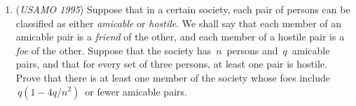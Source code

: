 \begin{enumerate}
(ii) there is a polynomial $\, P \,$ such that $\, |q_n| < P(n) \,$ for all $\, n$. 

Prove that there is a polynomial $\, Q \,$ such that $\, q_n = Q(n) \,$ for all $\, n$.


 

	\item (\textit{USAMO 1995}) Suppose that in a certain society, each pair of persons can be classified as either \textit{amicable} or \textit{hostile}. We shall say that each member of an amicable pair is a \textit{friend} of the other, and each member of a hostile pair is a \textit{foe} of the other.  Suppose that the society has $\, n \,$ persons and $\, q \,$ amicable pairs, and that for every set of three persons, at least one pair is hostile.  Prove that there is at least one member of the society whose foes include $\, q(1 - 4q/n^2) \,$ or fewer amicable pairs.  


 

\end{enumerate}